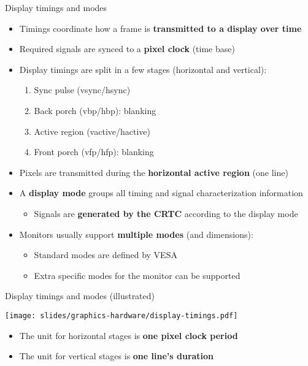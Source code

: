 \begin{frame}{Display timings and modes}
  \begin{itemize}
  \item Timings coordinate how a frame is \textbf{transmitted to a display over time}
  \item Required signals are synced to a \textbf{pixel clock} (time base)
  \item Display timings are split in a few stages (horizontal and vertical):
    \begin{enumerate}
    \item Sync pulse (vsync/hsync)
    \item Back porch (vbp/hbp): blanking
    \item Active region (vactive/hactive)
    \item Front porch (vfp/hfp): blanking
    \end{enumerate}
  \item Pixels are transmitted during the \textbf{horizontal active region} (one line)
  \item A \textbf{display mode} groups all timing and signal characterization information
    \begin{itemize}
    \item Signals are \textbf{generated by the CRTC} according to the display mode
    \end{itemize}
  \item Monitors usually support \textbf{multiple modes} (and dimensions):
    \begin{itemize}
    \item Standard modes are defined by VESA
    \item Extra specific modes for the monitor can be supported
    \end{itemize}
  \end{itemize}
\end{frame}

\begin{frame}{Display timings and modes (illustrated)}
  \begin{center}
  \texttt{[image: slides/graphics-hardware/display-timings.pdf]}
  \end{center}

  \begin{itemize}
  \item The unit for horizontal stages is \textbf{one pixel clock period}
  \item The unit for vertical stages is \textbf{one line's duration}
  \end{itemize}
\end{frame}

